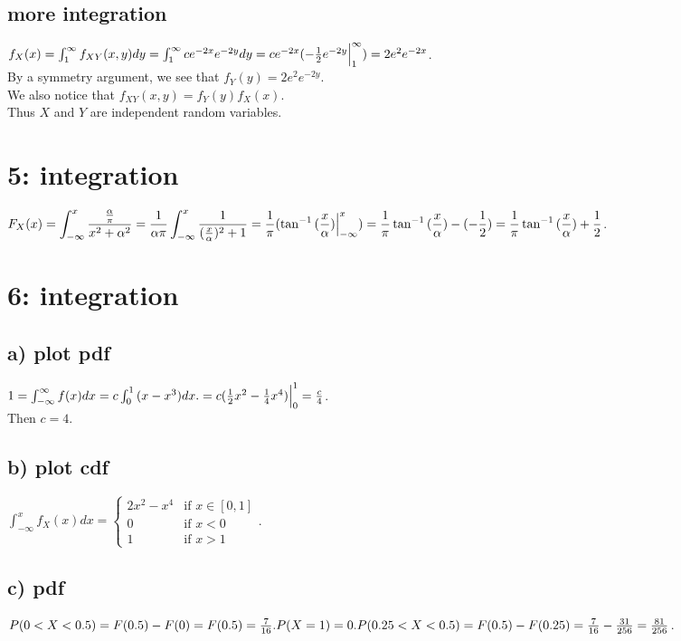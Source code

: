 \documentclass{article}
\begin{document}
\subsection*{more integration}
$f_X(x) = \int_1^\infty{f_{XY}(x, y)dy}
\\= \int_1^\infty{ce^{-2x}e^{-2y}dy}
\\= ce^{-2x}(-\frac{1}{2}e^{-2y} \Big|_1^\infty)
\\= 2e^{2}e^{-2x}$.
\\By a symmetry argument, we see that $f_Y(y) = 2e^{2}e^{-2y}$.
\\We also notice that $f_{XY}(x, y) = f_Y(y)f_X(x)$.
\\Thus $X$ and $Y$ are independent random variables.

\section*{5: integration}
$\displaystyle
F_X(x)
\\= \int_{-\infty}^x{\frac{\frac{\alpha}{\pi}}{x^2 + \alpha^2}}
\\= \frac{1}{\alpha\pi}\int_{-\infty}^x{\frac{1}{(\frac{x}{\alpha})^2 + 1}}
\\= \frac{1}{\pi}(\tan^{-1}{(\frac{x}{\alpha})} \Big|_{-\infty}^x)
\\= \frac{1}{\pi}\tan^{-1}{(\frac{x}{\alpha})} - (-\frac{1}{2})
\\= \frac{1}{\pi}\tan^{-1}{(\frac{x}{\alpha})} + \frac{1}{2}$.

\section*{6: integration}
\subsection*{a) plot pdf}
$1 = \int_{-\infty}^\infty{f(x)dx} = c\int_0^1{(x - x^3)dx}.
\\= c(\frac{1}{2}x^2 - \frac{1}{4}x^4) \Big|_0^1
\\= \frac{c}{4}$.
\\Then $c = 4$.

\subsection*{b) plot cdf}
$\int_{-\infty}^x{f_X(x)dx} = 
\begin{cases}
    2x^2 - x^4 & \text{if } x \in [0, 1] \\
    0 & \text{if } x < 0\\
    1 & \text{if } x > 1
\end{cases}
$.

\subsection*{c) pdf}
$P(0 < X < 0.5) = F(0.5) - F(0) = F(0.5) = \frac{7}{16}.
\\P(X = 1) = 0.
\\P(0.25 < X < 0.5) = F(0.5) - F(0.25)
= \frac{7}{16} - \frac{31}{256} = \frac{81}{256}
$.
\end{document}
